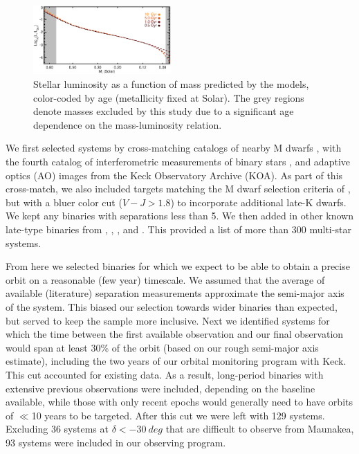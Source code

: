 \documentclass[twocolumn]{aastex62}
\begin{document}
\begin{figure}[htb]
\begin{center}
\includegraphics[width=0.47\textwidth]{Model_age2.eps}
\caption{Stellar luminosity as a function of mass predicted by the \citet{BHAC15} models, color-coded by age (metallicity fixed at Solar). The grey regions denote masses excluded by this study due to a significant age dependence on the mass-luminosity relation.}
\label{fig:age}
\end{center}
\end{figure}

We first selected systems by cross-matching catalogs of nearby M dwarfs \citep{Lepine:2013, Gaidos2014, 2014ApJ...784..156D,Winters2015}, with the fourth catalog of interferometric measurements of binary stars \citep[INT4,][]{Hartkopf:2001}, and adaptive optics (AO) images from the Keck Observatory Archive (KOA). As part of this cross-match, we also included targets matching the M dwarf selection criteria of \citet{Gaidos2014}, but with a bluer color cut ($V-J>1.8$) to incorporate additional late-K dwarfs. We kept any binaries with separations less than 5\arcsec. We then added in other known late-type binaries from \citet{2008MNRAS.384..150L}, \citet{Janson2012}, \citet{Jnn2014}, and \citet{Ward-Duong2015}. This provided a list of more than 300 multi-star systems.

From here we selected binaries for which we expect to be able to obtain a precise orbit on a reasonable (few year) timescale. We assumed that the average of available (literature) separation measurements approximate the semi-major axis of the system. This biased our selection towards wider binaries than expected, but served to keep the sample more inclusive. Next we identified systems for which the time between the first available observation and our final observation would span at least 30\% of the orbit (based on our rough semi-major axis estimate), including the two years of our orbital monitoring program with Keck. This cut accounted for existing data. As a result, long-period binaries with extensive previous observations were included, depending on the baseline available, while those with only recent epochs would generally need to have orbits of $\ll$10 years to be targeted. After this cut we were left with 129 systems. Excluding 36 systems at $\delta<-30~deg$ that are difficult to observe from Maunakea, 93 systems were included in our observing program.
\end{document}
